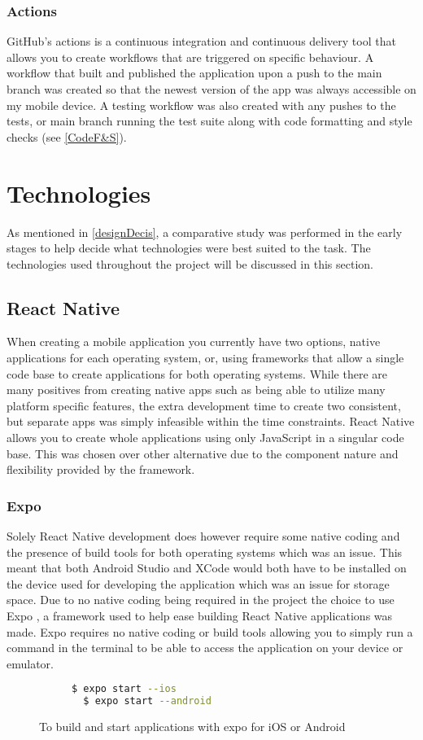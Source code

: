 \subsubsection{Actions}
GitHub's actions is a continuous integration and continuous delivery tool that allows you to create workflows that are triggered on specific behaviour. A workflow that built and published the application upon a push to the main branch was created so that the newest version of the app was always accessible on my mobile device. A testing workflow was also created with any pushes to the tests, or main branch running the test suite along with code formatting and style checks (see \ref{CodeF&S}).
\section{Technologies}
As mentioned in \ref{designDecis}, a comparative study \cite{compStudy} was performed in the early stages to help decide what technologies were best suited to the task. The technologies used throughout the project will be discussed in this section.
\subsection{React Native}\label{reactSection}
When creating a mobile application you currently have two options, native applications for each operating system, or, using frameworks that allow a single code base to create applications for both operating systems. While there are many positives from creating native apps such as being able to utilize many platform specific features, the extra development time to create two consistent, but separate apps was simply infeasible within the time constraints. React Native \cite{reactnative} allows you to create whole applications using only JavaScript \cite{js} in a singular code base. This was chosen over other alternative due to the component nature and flexibility provided by the framework. 
\subsubsection{Expo}
Solely React Native development does however require some native coding and the presence of build tools for both operating systems which was an issue. This meant that both Android Studio and XCode would both have to be installed on the device used for developing the application which was an issue for storage space. Due to no native coding being required in the project the choice to use Expo \cite{expo}, a framework used to help ease building React Native applications was made. Expo requires no native coding or build tools allowing you to simply run a command in the terminal to be able to access the application on your device or emulator.
\begin{figure}[!htbp]
\centering
\begin{subfigure}[b]{0.5\textwidth}
\begin{lstlisting}[language=bash]
  $ expo start --ios
  $ expo start --android
\end{lstlisting}
\end{subfigure}
\caption{To build and start applications with expo for iOS or Android}
\end{figure}
